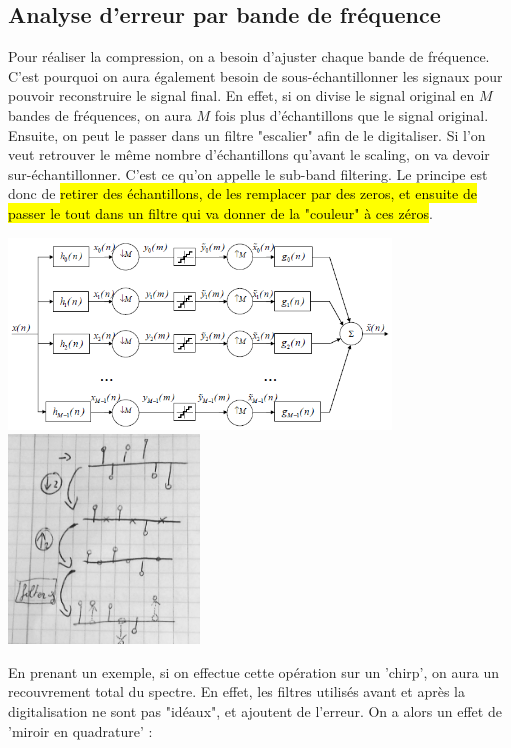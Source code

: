 \documentclass[letterpaper, 12pt]{article}
\newcommand{\alinea}{
\hspace*{0.5cm}}
\begin{document}
		\subsection{Analyse d'erreur par bande de fréquence}
			\alinea Pour réaliser la compression, on a besoin d'ajuster chaque bande de fréquence. C'est pourquoi on aura également
				besoin de sous-échantillonner les signaux pour pouvoir reconstruire le signal final. En effet, si on divise le
				signal original en $M$ bandes de fréquences, on aura $M$ fois plus d'échantillons que le signal original. Ensuite,
				on peut le passer dans un filtre "escalier" afin de le digitaliser. Si l'on veut retrouver le même nombre 
				d'échantillons qu'avant le scaling, on va devoir sur-échantillonner. C'est ce qu'on appelle le sub-band filtering.
				Le principe est donc de \hl{retirer des échantillons, de les remplacer par des zeros, et ensuite de passer le tout dans un
				filtre qui va donner de la "couleur" à ces zéros}.
			\begin{center}
				\includegraphics[width=4in]{Images/subband} \hfill \includegraphics[width=2in]{Images/subband2}
			\end{center}
			\alinea En prenant un exemple, si on effectue cette opération sur un 'chirp', on aura un recouvrement total du spectre.
				En effet, les filtres utilisés avant et après la digitalisation ne sont pas "idéaux", et ajoutent de l'erreur.
				On a alors un effet de 'miroir en quadrature' :
\end{document}
